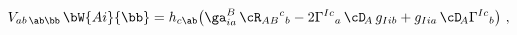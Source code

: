 \begin{equation}
  V_{ab\,\ab\bb}\, \bW{Ai}{\bb} = h_{c\ab} \big( \ga^B_{ia}\, \cR_{AB}
  {}^c{}_{b} - 2 \Gamma^{Ic}{}_{a}\, \cD_{\!A}\, g_{Iib} + g_{Iia}\,
  \cD_{\!A} \Gamma^{Ic}{}_{b} \big)\ ,
 \end{equation}


